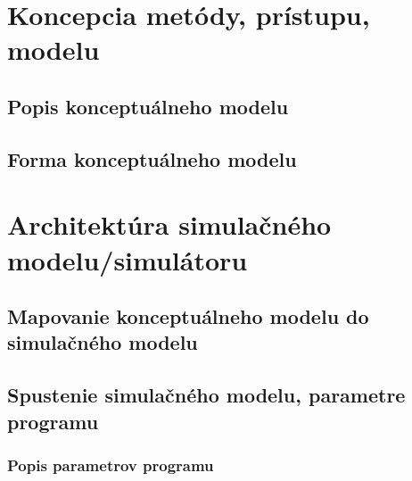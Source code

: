 \documentclass[a4paper, 11pt]{article}
\begin{document}
\pagebreak
\section{Koncepcia metódy, prístupu, modelu}



\subsection{Popis konceptuálneho modelu}



\subsection{Forma konceptuálneho modelu}



\pagebreak
\section{Architektúra simulačného modelu/simulátoru}



\subsection{Mapovanie konceptuálneho modelu do simulačného modelu}



\subsection{Spustenie simulačného modelu, parametre programu}



\subsubsection{Popis parametrov programu}



\pagebreak
\end{document}
